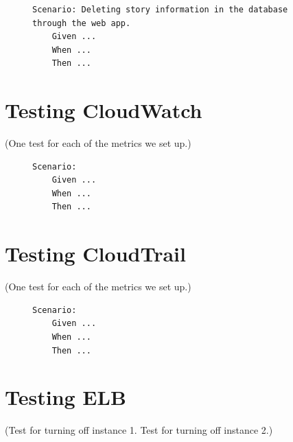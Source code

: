 \begin{figure}[!htbp]
    \centering
    \begin{verbatim}
Scenario: Deleting story information in the database through the web app.
    Given ...
    When ...
    Then ...
    \end{verbatim}
    \label{fig:delete-story-data}
\end{figure}

\section{Testing CloudWatch}\label{sec:testing-cloudwatch}

(One test for each of the metrics we set up.)

\begin{figure}[!htbp]
    \centering
    \begin{verbatim}
Scenario:
    Given ...
    When ...
    Then ...
    \end{verbatim}
    \label{fig:cloudwatch-}
\end{figure}

\section{Testing CloudTrail}\label{sec:testing-cloudtrail}

(One test for each of the metrics we set up.)

\begin{figure}[!htbp]
    \centering
    \begin{verbatim}
Scenario:
    Given ...
    When ...
    Then ...
    \end{verbatim}
    \label{fig:cloudtrail-}
\end{figure}

\section{Testing ELB}\label{sec:testing-elb}

(Test for turning off instance 1. Test for turning off instance 2.)